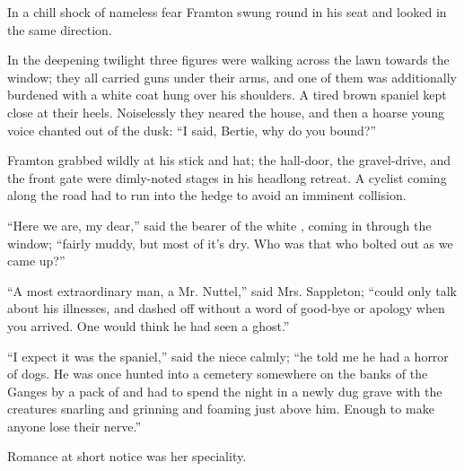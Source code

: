 \documentclass{fiche}
\begin{document}
\begin{version}
In a chill shock of nameless fear Framton swung round in his seat and looked in the same
direction.

In the deepening twilight three figures were walking across the lawn towards the window; they
all carried guns under their arms, and one of them was additionally burdened with a white
coat hung over his shoulders. A tired brown spaniel kept close at their heels. Noiselessly
they neared the house, and then a hoarse young voice chanted out of the dusk: ``I said,
Bertie, why do you bound?''

Framton grabbed wildly at his stick and hat; the hall-door, the gravel-drive, and the front
gate were dimly-noted stages in his headlong retreat. A cyclist coming along the road had to
run into the hedge to avoid an imminent collision.

``Here we are, my dear,'' said the bearer of the white , coming in through the window; ``fairly muddy, but most of it's dry. Who was
that who bolted out as we came up?''

``A most extraordinary man, a Mr. Nuttel,'' said Mrs. Sappleton; ``could only talk about his
illnesses, and dashed off without a word of good-bye or apology when you arrived. One would
think he had seen a ghost.''

``I expect it was the spaniel,'' said the niece calmly; ``he told me he had a horror of dogs.
He was once hunted into a cemetery somewhere on the banks of the Ganges by a pack of
 and had to spend the night in a newly dug
grave with the creatures snarling and grinning and foaming just above him. Enough to make
anyone lose their nerve.''

Romance at short notice was her speciality.
\end{version}

\end{document}
